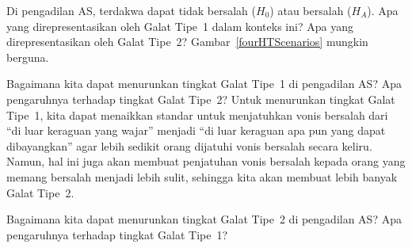 \begin{exercisewrap}
\begin{nexercise} \label{whatAreTheErrorTypesInUSCourts}
Di pengadilan AS, terdakwa dapat tidak bersalah ($H_0$) atau
bersalah ($H_A$).
Apa yang direpresentasikan oleh Galat Tipe~1 dalam konteks ini?
Apa yang direpresentasikan oleh Galat Tipe~2?
Gambar~\ref{fourHTScenarios} mungkin berguna.\footnotemark{}
\end{nexercise}
\end{exercisewrap}

\begin{examplewrap}
\begin{nexample}{Bagaimana kita dapat menurunkan tingkat Galat Tipe~1
    di pengadilan AS?
    Apa pengaruhnya terhadap tingkat Galat Tipe~2?}
    \label{howToReduceType1ErrorsInUSCourts}%
  Untuk menurunkan tingkat Galat Tipe~1, kita dapat
  menaikkan standar untuk menjatuhkan vonis bersalah dari
  ``di luar keraguan yang wajar'' menjadi
  ``di luar keraguan apa pun yang dapat dibayangkan'' agar lebih sedikit orang
  dijatuhi vonis bersalah secara keliru. Namun, hal ini juga akan membuat
  penjatuhan vonis bersalah kepada orang yang memang
  bersalah menjadi lebih sulit, sehingga kita akan membuat lebih banyak Galat Tipe~2.
\end{nexample}
\end{examplewrap}

\begin{exercisewrap}
\begin{nexercise} \label{howToReduceType2ErrorsInUSCourts}
Bagaimana kita dapat menurunkan tingkat Galat Tipe~2 di pengadilan AS?
Apa pengaruhnya terhadap tingkat Galat Tipe~1?
\footnotemark
\end{nexercise}
\end{exercisewrap}

